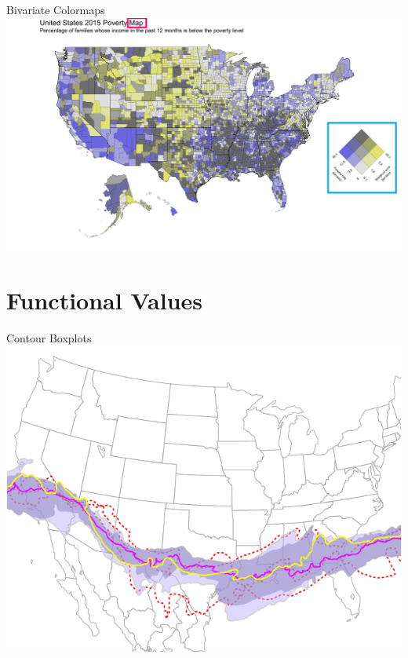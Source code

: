 \documentclass[xcolor={dvipsnames}]{beamer}
\begin{document}
\begin{frame}{Bivariate Colormaps\cite{lucchesi_visualizing_2017}}
\includegraphics[width=\textwidth]{figs/bivariate_anotated.png}
\end{frame}


\section{Functional Values}
\frame{\sectionpage}

\begin{frame}{Contour Boxplots\cite{whitaker_contour_2013}}
\includegraphics[height=.75\textheight]{figs/contour_weather.png}
\end{frame}
\end{document}
